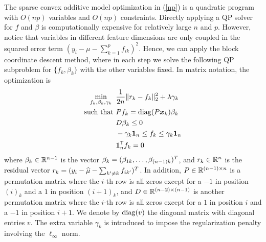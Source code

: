 The sparse convex additive model optimization in (\ref{np}) is a quadratic program with
$O(np)$ variables and $O(np)$ constraints. 
Directly applying a QP solver for $f$ and $\beta$
is computationally expensive for relatively large
$n$ and $p$. However, notice that variables in different feature
dimensions are only coupled in the squared error term
$(y_{i}-\mu - \sum_{k=1}^{p}f_{ik})^{2}$. Hence, we can apply the block
coordinate descent method, where in each step we solve the following
QP subproblem for $\{f_k, \beta_k\}$ with the
other variables fixed. In matrix notation, the optimization is
\begin{align}
\begin{split}
\min_{ f_k, \beta_k, \gamma_k} \;\;& \frac{1}{2n} \| r_k - f_k \|_2^2 
     + \lambda \gamma_k \label{opt:1d_compact} \\
 \textrm{such that } & P f_k = \mathop{\rm diag}(P \boldsymbol{x}_k)  \beta_k \\
   & D \beta_k \leq 0 \\
   & -\gamma_k \mbox{\boldmath $1$}_n \leq f_k \leq \gamma_k \mbox{\boldmath $1$}_n   \\
   & \mbox{\boldmath $1$}_n^{\mathsf{T}} f_k = 0 
\end{split}
\end{align}
where $\beta_k \in {\mathbb R}^{n-1}$ is the vector $\beta_k =
(\beta_{1k}, \ldots, \beta_{(n-1)k})^T$, and
$r_{k} \in {\mathbb R}^n$ is the residual vector $r_{k} = (y_i -
\widehat\mu - \sum_{k' \neq k} f_{ik'})^T$.
In addition, 
$P \in {\mathbb R}^{(n-1) \times n}$ is a permutation matrix where the $i$-th
row  is all zeros except for a $-1$ in position $(i)_k$ and a $1$ in
position $(i+1)_k$, and $D \in {\mathbb R}^{(n-2) \times (n-1)}$ is another
permutation matrix  where the $i$-th row is all zeros except for a $1$ 
in position $i$ and a $-1$ in position $i+1$.  We denote by
$\mathop{\rm diag}( v )$ the diagonal matrix with diagonal entries $v$.
The extra variable $\gamma_{k}$ is introduced to impose the
regularization penalty involving the $\ell_{\infty}$ norm.  


